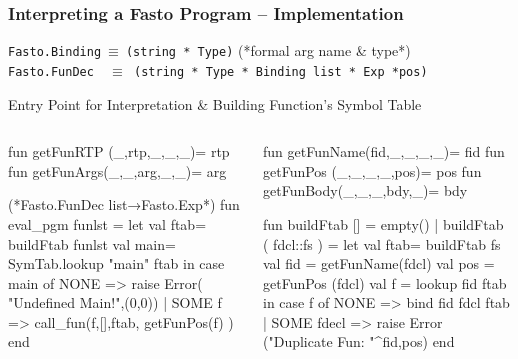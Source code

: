 \documentclass{beamer}
\newcommand{\emp}[1]{\textcolor{DikuRed}{ #1}}
\newcommand{\emphh}[1]{\textcolor{CosGreen}{ #1}}
\begin{document}
\begin{frame}[fragile, t]
\frametitle{Interpreting a Fasto Program -- Implementation}

{\tt Fasto.Binding$~\equiv~$(string~*~Type)} (*formal arg name \& type*)\\
{\tt Fasto.FunDec~~$\equiv$~(string~*~Type~*~Binding~list~*~Exp~*pos)}

\begin{block}{Entry Point for Interpretation \& Building Function's Symbol Table}
\begin{columns}
\vspace{-2ex}
\begin{colorcode}[fontsize=\scriptsize]
fun getFunRTP (_,rtp,_,_,_)= rtp
fun getFunArgs(_,_,arg,_,_)= arg

(*Fasto.FunDec list→Fasto.Exp*)
\alert{fun eval\_pgm funlst =}
  let val ftab= \emp{buildFtab} funlst
      val main= \emphh{SymTab.lookup}
                  "main" ftab
  in case main of
       NONE => raise Error(
         "Undefined Main!",(0,0))
     | SOME f =>
         \alert{call\_fun}(f,[],ftab,
                   getFunPos(f) )
  end
\end{colorcode} 
\vspace{-2ex}
\begin{colorcode}[fontsize=\scriptsize]
fun getFunName(fid,_,_,_,_)= fid
fun getFunPos (_,_,_,_,pos)= pos
fun getFunBody(_,_,_,bdy,_)= bdy

\emp{fun buildFtab} [] = empty()
| \emp{buildFtab} ( fdcl::fs ) =
  let val ftab= \emp{buildFtab} fs
      val fid = getFunName(fdcl)
      val pos = getFunPos (fdcl)
      val f   = \emphh{lookup} fid ftab
  in case f of
       NONE => \emphh{bind} fid fdcl ftab
     | SOME fdecl => raise Error
        ("Duplicate Fun: "^fid,pos)
  end
\end{colorcode}
\end{columns}
\end{block}

\end{frame}
\end{document}
